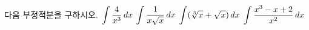 다음 부정적분을 구하시오.
 $\displaystyle\int \dfrac{4}{x^3}\mkern3mu dx$
 $\displaystyle\int \dfrac{1}{x\sqrt{x}}\mkern3mu dx$
 $\displaystyle\int (\sqrt[3]{x}+\sqrt{x})\mkern3mu dx$
 $\displaystyle\int \dfrac{x^3-x+2}{x^2}\mkern3mu dx$
